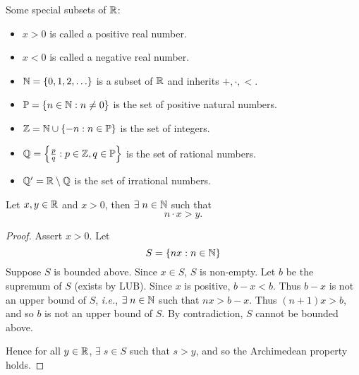 Some special subsets of $\mathbb{R}$:
\begin{itemize}
    \item $x > 0$ is called a positive real number.
    \item $x < 0$ is called a negative real number.
    \item $\N = \set{0, 1, 2, \dots}$ is a subset of $\mathbb{R}$ and inherits $+, \cdot, <$.
    \item $\P = \set{n \in \N : n \neq 0}$ is the set of positive natural numbers.
    \item $\Z = \N \cup \set{-n : n \in \P}$ is the set of integers.
    \item $\Q = \set{\frac{p}{q} : p \in \Z, q \in \P}$ is the set of rational numbers.
    \item $\mathbb{Q}' = \mathbb{R} \setminus \mathbb{Q}$ is the set of irrational numbers.
\end{itemize}

\begin{thm} \label{thm:R:archimedean}
    Let $x, y \in \mathbb{R}$ and $x > 0$, then $\exists\; n \in \mathbb{N}$ such that \[
        n \cdot x > y.
    \]
\end{thm}
\begin{proof}
    Assert $x > 0$. Let \[
        S = \set{nx : n \in \N}
    \]
    Suppose $S$ is bounded above.
    Since $x \in S$, $S$ is non-empty.
    Let $b$ be the supremum of $S$ (exists by LUB).
    Since $x$ is positive, $b - x < b$.
    Thus $b - x$ is not an upper bound of $S$, \textit{i.e.}, $\exists\; n \in \mathbb{N}$ such that $nx > b - x$.
    Thus $(n + 1)x > b$, and so $b$ is not an upper bound of $S$.
    By contradiction, $S$ cannot be bounded above.

    Hence for all $y \in \mathbb{R}$, $\exists\; s \in S$ such that $s > y$, and so the Archimedean property holds.
\end{proof}
